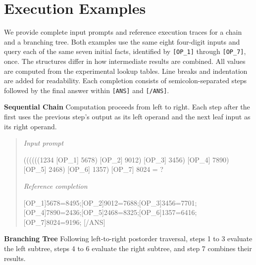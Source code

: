 \documentclass[]{template}
\theoremstyle{plain}
\theoremstyle{definition}
\theoremstyle{remark}
\renewcommand{\paragraph}[1]{\vspace{1mm}\noindent\textbf{#1}}
\begin{document}
\section{Execution Examples}
\label{sec:execution_examples}


We provide complete input prompts and reference execution traces for a chain and a branching tree. Both examples use the same eight four-digit inputs and query each of the same seven initial facts, identified by \texttt{[OP\_1]} through \texttt{[OP\_7]}, once. The structures differ in how intermediate results are combined. All values are computed from the experimental lookup tables. Line breaks and indentation are added for readability. Each completion consists of semicolon-separated steps followed by the final answer within \texttt{[ANS]} and \texttt{[/ANS]}.

\paragraph{Sequential Chain}
Computation proceeds from left to right. Each step after the first uses the previous step's output as its left operand and the next leaf input as its right operand.

\begin{quote}
\small
\textit{Input prompt}\par\smallskip
{\ttfamily\noindent
((((((1234 [OP\_1] 5678) [OP\_2] 9012) [OP\_3] 3456)\newline
\hspace*{1em}[OP\_4] 7890) [OP\_5] 2468) [OP\_6] 1357) [OP\_7] 8024 = ?\par}
\medskip
\textit{Reference completion}\par\smallskip
{\ttfamily{}[OP\_1]5678=8495;[OP\_2]9012=7688;[OP\_3]3456=7701;[OP\_4]7890=2436;[OP\_5]2468=8325;[OP\_6]1357=6416;[OP\_7]8024=9196; [/ANS]\par}
\end{quote}

\paragraph{Branching Tree}
Following left-to-right postorder traversal, steps 1 to 3 evaluate the left subtree, steps 4 to 6 evaluate the right subtree, and step 7 combines their results.
\end{document}
